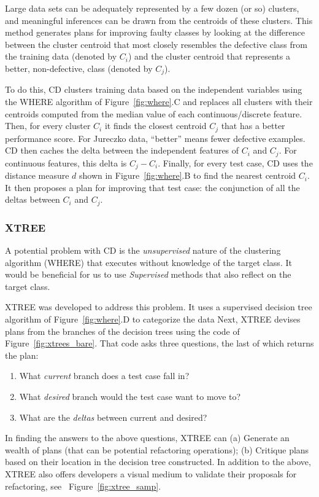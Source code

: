 \documentclass{sig-alternate}
\newcommand{\be}{\begin{enumerate}}
\newcommand{\ee}{\end{enumerate}}
\newcommand{\fig}[1]{Figure~\ref{fig:#1}}
\begin{document}
Large data sets can be adequately represented by a few dozen (or so) clusters, and meaningful inferences can be drawn from the centroids of these clusters. This method generates plans for improving faulty classes by looking at the difference between the cluster centroid that most closely resembles the defective class from the training data (denoted by $C_i$) and the cluster centroid that represents a better, non-defective, class (denoted by $C_j$).
 
To do this, CD clusters training data based on the independent variables using the WHERE algorithm of \fig{where}.C and replaces all clusters with their centroids computed from the median value of each continuous/discrete feature. Then, for every cluster $C_i$ it finds the closest centroid $C_j$ that has a better performance score. For Jureczko data, ``better'' means fewer defective examples. CD then caches the delta between the independent features of $C_i$ and $C_j$. For continuous features, this delta is $C_j - C_i$. Finally, for every test case, CD uses the distance measure $d$ shown in \fig{where}.B to find the nearest centroid $C_i$.  It then proposes a plan for improving that test case: the conjunction of all the deltas between $C_i$ and $C_j$.




\subsubsection{XTREE}

A potential problem with CD is the {\em unsupervised} nature of the clustering algorithm (WHERE) that executes without knowledge of the target class. It would be beneficial for us to use {\em Supervised} methods that also reflect on the target class.

XTREE was developed to address this problem. It uses a supervised decision tree algorithm of \fig{where}.D to categorize the data Next, XTREE devises plans from the branches of the decision trees using the code of \fig{xtrees_bare}. That code asks three questions, the last of which returns the plan:

\be
\item What {\em current} branch does a test case fall in?
\item What {\em desired} branch would the test case want to move to?
\item What are the {\em deltas} between current and desired? 
\ee

In finding the answers to the above questions, XTREE can (a) Generate an wealth of plans (that can be potential refactoring operations); (b) Critique plans based on their location in the decision tree constructed. In addition to the above, XTREE also offers developers a visual medium to validate their proposals for refactoring, see ~\fig{xtree_samp}.
\end{document}
